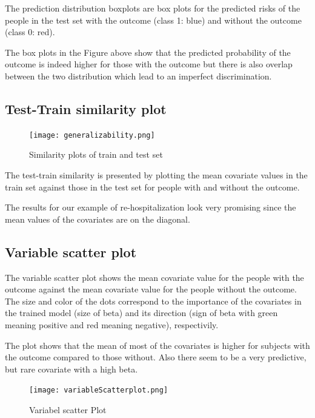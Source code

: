 \documentclass[]{article}
\begin{document}
The prediction distribution boxplots are box plots for the predicted
risks of the people in the test set with the outcome (class 1: blue) and
without the outcome (class 0: red).

The box plots in the Figure above show that the predicted probability of
the outcome is indeed higher for those with the outcome but there is
also overlap between the two distribution which lead to an imperfect
discrimination.

\newpage

\subsection{Test-Train similarity
plot}\label{test-train-similarity-plot}

\begin{figure}
\centering
\texttt{[image: generalizability.png]}
\caption{Similarity plots of train and test set}
\end{figure}

The test-train similarity is presented by plotting the mean covariate
values in the train set against those in the test set for people with
and without the outcome.

The results for our example of re-hospitalization look very promising
since the mean values of the covariates are on the diagonal.

\newpage

\subsection{Variable scatter plot}\label{variable-scatter-plot}

The variable scatter plot shows the mean covariate value for the people
with the outcome against the mean covariate value for the people without
the outcome. The size and color of the dots correspond to the importance
of the covariates in the trained model (size of beta) and its direction
(sign of beta with green meaning positive and red meaning negative),
respectivily.

The plot shows that the mean of most of the covariates is higher for
subjects with the outcome compared to those without. Also there seem to
be a very predictive, but rare covariate with a high beta.

\begin{figure}
\centering
\texttt{[image: variableScatterplot.png]}
\caption{Variabel scatter Plot}
\end{figure}
\end{document}
